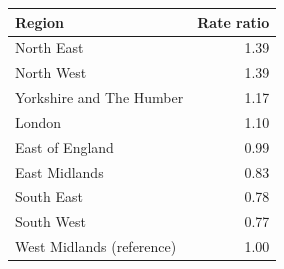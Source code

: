 \begin{tabular}{lr}
\toprule
Region & Rate ratio
\\
\midrule
North East & 1.39 \\
North West & 1.39 \\
Yorkshire and The Humber & 1.17 \\
London & 1.10 \\
East of England & 0.99 \\
East Midlands & 0.83 \\
South East & 0.78 \\
South West & 0.77 \\
West Midlands (reference) & 1.00 \\
\bottomrule
\end{tabular}
